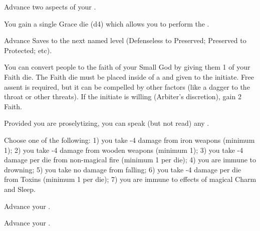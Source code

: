 \begin{multicols*}{2}

Advance two  aspects of your  \DCUP. 



You gain a single Grace die (d4) which allows you to perform the .


Advance  Saves to the next named level (Defenseless to Preserved; Preserved to Protected; etc).


You can convert people to the faith of your Small God by giving them 1 of your Faith die.  The Faith die must be placed inside of a  and given to the initiate. Free assent is required, but it can be compelled by other factors (like a dagger to the throat or other threats). If the initiate is willing (Arbiter's discretion), gain 2 Faith.

Provided you are proselytizing, you can speak (but not read) any .



\newpage





Choose one of the following: 1) you take -4 damage from iron weapons (minimum 1); 2) you take -4 damage from wooden weapons (minimum 1); 3) you take -4 damage per die from non-magical fire (minimum 1 per die); 4) you are immune to drowning; 5) you take no damage from falling; 6) you take -4 damage per die from Toxins (minimum 1 per die); 7) you are immune to effects of magical Charm and Sleep.


\cbreak




Advance your \JUJU \DCUP.


Advance your \JUJU \DCUP. 

\end{multicols*}


